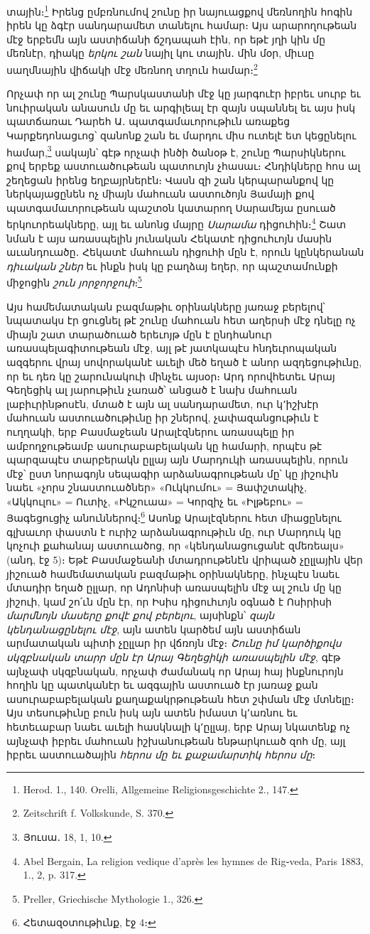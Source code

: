 \documentclass{article}
\begin{document}
{տային։\footnote{Herod. 1., 140. Orelli, Allgemeine Religionsgeschichte 2., 147.} Իրենց ըմբռնումով շունը իր նայուացքով մեռնողին հոգին իրեն կը ձգէր սանդարամետ տանելու համար։ Այս արարողութեան մէջ երբեմն այն աստիճանի ճշդապահ էին, որ եթէ յղի կին մը մեռնէր, դիակը \emph{երկու շան} նայիլ կու տային․ մին մօր, միւսը սաղմնային վիճակի մէջ մեռնող տղուն համար։\footnote{Zeitschrift f. Volkskunde, S. 370.}

Որչափ որ ալ շունը Պարսկաստանի մէջ կը յարգուէր իբրեւ սուրբ եւ նուիրական անասուն մը եւ արգիլեալ էր զայն սպաննել եւ այս իսկ պատճառաւ Դարեհ Ա․ պատգամաւորութիւն առաքեց Կարքեդոնացւոց՝ զանոնք շան եւ մարդու միս ուտելէ ետ կեցընելու համար,\footnote{Յուսա․ 18, 1, 10.} սակայն՝ գէթ որչափ ինծի ծանօթ է, շունը Պարսիկներու քով երբեք աստուածութեան պատուոյն չհասաւ։ Հնդիկները հոս ալ շեղեցան իրենց եղբայրներէն։ Վասն զի շան կերպարանքով կը ներկայացընեն ոչ միայն մահուան աստուծոյն Յամայի քով պատգամաւորութեան պաշտօն կատարող Սարամեյա ըսուած երկուորեակները, այլ եւ անոնց մայրը \emph{Սարամա} դիցուհին։\footnote{Abel Bergain, La religion vedique d'après les hymnes de Rig֊veda, Paris 1883, 1., 2, p. 317.} Շատ նման է այս առասպելին յունական Հեկատէ դիցուհւոյն մասին աւանդուածը․ Հեկատէ մահուան դիցուհի մըն է, որուն կընկերանան \emph{դիւական շներ} եւ ինքն իսկ կը բաղձայ եղեր, որ պաշտամունքի միջոցին \emph{շուն յորջորջուի}։\footnote{Preller, Griechische Mythologie 1., 326.}

Այս համեմատական բազմաթիւ օրինակները յառաջ բերելով՝ նպատակս էր ցուցնել թէ շունը մահուան հետ աղերսի մէջ դնելը ոչ միայն շատ տարածուած երեւոյթ մըն է ընդհանուր առասպելագիտութեան մէջ, այլ թէ յատկապէս հնդեւրոպական ազգերու վրայ սովորականէ աւելի մեծ եղած է անոր ազդեցութիւնը, որ եւ դեռ կը շարունակուի մինչեւ այսօր։ Արդ որովհետեւ Արայ Գեղեցիկ ալ յարութիւն չառած՝ անցած է նախ մահուան լաբիւրինթոսէն, մտած է այն ալ սանդարամետ, ուր կ՚իշխէր մահուան աստուածութիւնը իր շներով, չափազանցութիւն է ուղղակի, երբ Բասմաջեան Արալէզներու առասպելը իր ամբողջութեամբ ասուրաբաբելական կը համարի, որպէս թէ պարզապէս տարբերակն ըլլայ այն Մարդուկի առասպելին, որուն մէջ՝ ըստ նորագոյն սեպագիր արձանագրութեան մը՝ կը յիշուին նաեւ «չորս շնաստուածներ» «Ուկկումու» = Յափշտակիչ, «Ակկուլու» = Ուտիչ, «Իկշուաա» = Կորզիչ եւ «Իլթեբու» = Յագեցուցիչ անուններով։\footnote{Հետազօտութիւնք, էջ 4։} Ասոնք Արալէզներու հետ միացընելու գլխաւոր փաստն է ուրիշ արձանագրութիւն մը, ուր Մարդուկ կը կոչուի քահանայ աստուածոց, որ «կենդանացուցանէ զմեռեալս» (անդ, էջ 5)։ Եթէ Բասմաջեանի մտադրութենէն վրիպած չըլլային վեր յիշուած համեմատական բազմաթիւ օրինակները, ինչպէս նաեւ մտադիր եղած ըլլար, որ Ադոնիսի առասպելին մէջ ալ շուն մը կը յիշուի, կամ շո՛ւն մըն էր, որ Իսիս դիցուհւոյն օգնած է Ոսիրիսի \emph{մարմնոյն մասերը քովէ քով բերելու}, այսինքն՝ \emph{զայն կենդանացընելու մէջ}, այն ատեն կարծեմ այն աստիճան արմատական պիտի չըլլար իր վճռոյն մէջ։ \emph{Շունը իմ կարծիքովս սկզբնական տարր մըն էր Արայ Գեղեցիկի առասպելին մէջ}, գէթ այնչափ սկզբնական, որչափ ժամանակ որ Արայ հայ ինքնուրոյն հողին կը պատկանէր եւ ազգային աստուած էր յառաջ քան ասուրաբաբելական քաղաքակրթութեան հետ շփման մէջ մտնելը։ Այս տեսութիւնը բուն իսկ այն ատեն իմաստ կ՚առնու եւ հետեւաբար նաեւ աւելի հասկնալի կ՚ըլլայ, երբ Արայ նկատենք ոչ այնչափ իբրեւ մահուան իշխանութեան ենթարկուած զոհ մը, այլ իբրեւ աստուածային \emph{հերոս մը եւ քաջամարտիկ հերոս մը}։

}
\end{document}
